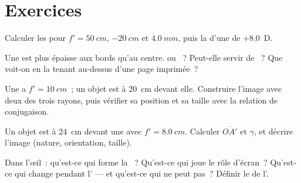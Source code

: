 \section{Exercices}

\begin{exercise}[$\star$]\label{exo:g11:lenses-and-eye:1}
Calculer les  pour $f' = \qty{50}{cm}$,
$\qty{-20}{cm}$ et $\qty{4.0}{mm}$, puis la
 d'une 
de $+8.0$~D.
\end{exercise}

\begin{exercise}[$\star$]\label{exo:g11:lenses-and-eye:2}
Une  est plus épaisse aux bords qu'au centre.
 ou ~?
Peut-elle servir de ~? Que voit-on en la tenant
au-dessus d'une page imprimée~?
\end{exercise}

\begin{exercise}[$\star$]\label{exo:g11:lenses-and-eye:3}
Une  a $f' = \qty{10}{cm}$~; un objet
est à \qty{20}{cm} devant elle. Construire l'image avec deux des trois
rayons, puis vérifier sa position et sa taille avec la relation de
conjugaison.
\end{exercise}

\begin{exercise}[$\star$]\label{exo:g11:lenses-and-eye:4}
Un objet est à \qty{24}{cm} devant une
 avec $f' = \qty{8.0}{cm}$. Calculer
$\overline{OA'}$ et $\gamma$, et décrire l'image (nature, orientation,
taille).
\end{exercise}

\begin{exercise}[$\star$]\label{exo:g11:lenses-and-eye:5}
Dans l'œil~: qu'est-ce qui forme la
~? Qu'est-ce qui joue le rôle
d'écran~? Qu'est-ce qui change pendant
l' --- et qu'est-ce qui ne peut pas~?
Définir le  de
l'.
\end{exercise}

